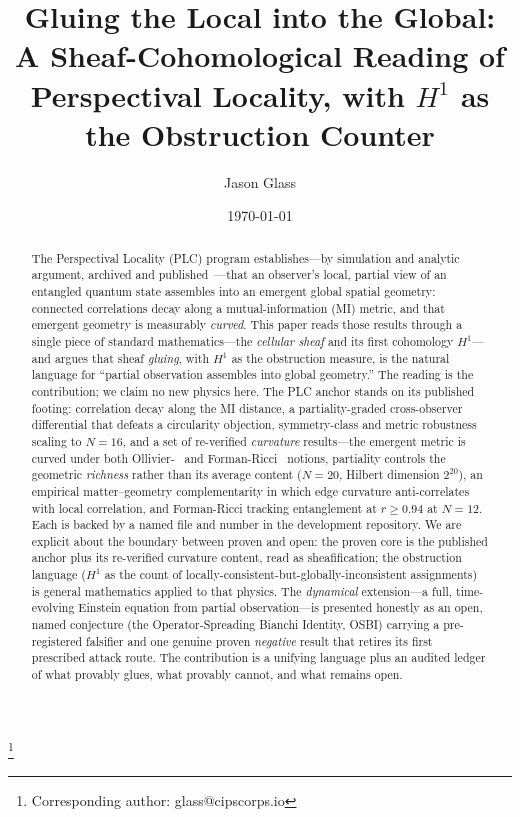 \documentclass[aps,pra,twocolumn,superscriptaddress,floatfix]{revtex4-2}
\theoremstyle{definition}
\begin{document}
\title{Gluing the Local into the Global: A Sheaf-Cohomological Reading of
Perspectival Locality, with $H^1$ as the Obstruction Counter}

\author{Jason Glass}
\thanks{Corresponding author: glass@cipscorps.io}

\date{\today}

\begin{abstract}
The Perspectival Locality (PLC) program establishes---by simulation and
analytic argument, archived and published~\cite{glass2026plc1}---that an
observer's local, partial view of an entangled quantum state assembles into an
emergent global spatial geometry: connected correlations decay along a
mutual-information (MI) metric, and that emergent geometry is measurably
\emph{curved}. This paper reads those results through a single piece of
standard mathematics---the \emph{cellular sheaf} and its first cohomology
$H^1$---and argues that sheaf \emph{gluing}, with $H^1$ as the obstruction
measure, is the natural language for ``partial observation assembles into
global geometry.'' The reading is the contribution; we claim no new physics
here. The PLC anchor stands on its published footing: correlation decay along
the MI distance, a partiality-graded cross-observer differential that defeats a
circularity objection, symmetry-class and metric robustness scaling to $N=16$,
and a set of re-verified \emph{curvature} results---the emergent metric is
curved under both Ollivier-~\cite{ollivier2009} and Forman-Ricci~\cite{forman2003}
notions, partiality controls the geometric \emph{richness} rather than its
average content ($N=20$, Hilbert dimension $2^{20}$), an empirical
matter--geometry complementarity in which edge curvature anti-correlates with
local correlation, and Forman-Ricci tracking entanglement at $r\geq0.94$ at
$N=12$. Each is backed by a named file and number in the development
repository. We are explicit about the boundary between proven and open: the
proven core is the published anchor plus its re-verified curvature content,
read as sheafification; the obstruction language ($H^1$ as the count of
locally-consistent-but-globally-inconsistent assignments) is general
mathematics applied to that physics. The \emph{dynamical} extension---a full,
time-evolving Einstein equation from partial observation---is presented
honestly as an open, named conjecture (the Operator-Spreading Bianchi Identity,
OSBI) carrying a pre-registered falsifier and one genuine proven \emph{negative}
result that retires its first prescribed attack route. The contribution is a
unifying language plus an audited ledger of what provably glues, what provably
cannot, and what remains open.
\end{abstract}
\end{document}
